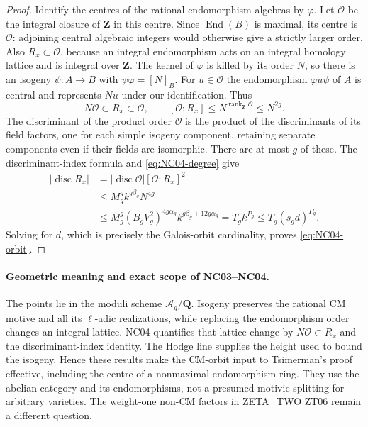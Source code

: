 \documentclass[11pt]{article}
\theoremstyle{remark}
\begin{document}
\begin{proof}
Identify the centres of the rational endomorphism algebras by
$\varphi$.  Let $\mathcal O$ be the integral closure of $\mathbf Z$
in this centre.  Since $\operatorname{End}(B)$ is maximal,
its centre is $\mathcal O$: adjoining central algebraic integers
would otherwise give a strictly larger order.  Also
$R_x\subset\mathcal O$, because an integral endomorphism acts on
an integral homology lattice and is integral over $\mathbf Z$.
The kernel of $\varphi$ is killed by its order $N$, so there is an
isogeny $\psi:A\to B$ with $\psi\varphi=[N]_B$.
For $u\in\mathcal O$ the endomorphism
$\varphi u\psi$ of $A$ is central and represents $Nu$ under our
identification.  Thus
\[
 N\mathcal O\subset R_x\subset\mathcal O,
 \qquad [\mathcal O:R_x]\leq N^{\operatorname{rank}_{\mathbf Z}\mathcal O}
                         \leq N^{2g}.
\]
The discriminant of the product order $\mathcal O$ is the product
of the discriminants of its field factors, one for each simple
isogeny component, retaining separate components even if their
fields are isomorphic.  There are at most $g$ of these.  The discriminant-index formula
and \eqref{eq:NC04-degree} give
\begin{align*}
 |\operatorname{disc}R_x|
 &=|\operatorname{disc}\mathcal O|[\mathcal O:R_x]^2\\
 &\leq M_g^gk^{g\beta_g}N^{4g}\\
 &\leq M_g^g(B_gV_g^2)^{4g\alpha_g}
             k^{g\beta_g+12g\alpha_g}
   =T_gk^{P_g}\leq T_g(s_gd)^{P_g}.
\end{align*}
Solving for $d$, which is precisely the Galois-orbit cardinality,
proves \eqref{eq:NC04-orbit}.
\end{proof}

\paragraph{Geometric meaning and exact scope of NC03--NC04.}
The points lie in the moduli scheme $\mathcal A_g/\mathbf Q$.
Isogeny preserves the rational CM motive and all its $\ell$-adic
realizations, while replacing the endomorphism order changes an integral
lattice.  NC04 quantifies that lattice change by
$N\mathcal O\subset R_x$ and the discriminant-index identity.
The Hodge line supplies the height used to bound the isogeny.
Hence these results make the CM-orbit input to Tsimerman's proof
effective, including the centre of a nonmaximal endomorphism ring.
They use the abelian category and its endomorphisms, not a presumed
motivic splitting for arbitrary varieties.  The weight-one non-CM
factors in ZETA\_TWO ZT06 remain a different question.
\end{document}
